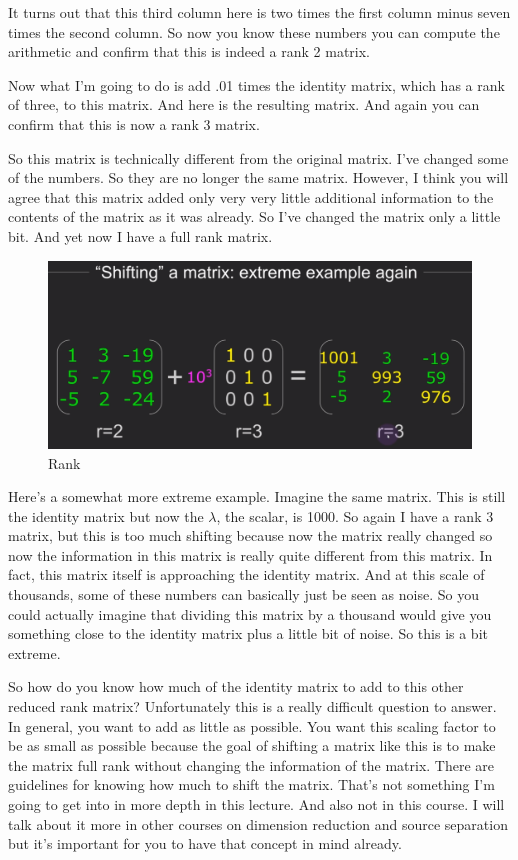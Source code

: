 \documentclass[fleqn,10pt]{olplainarticle}
\theoremstyle{definition}
\theoremstyle{remark}
\begin{document}
It turns out that this third column here is two times the first column minus seven times the second column. So now you know these numbers you can compute the arithmetic and confirm that this is indeed a rank 2 matrix.

Now what I'm going to do is add .01 times the identity matrix, which has a rank of three, to this matrix. And here is the resulting matrix. And again you can confirm that this is now a rank 3 matrix.

So this matrix is technically different from the original matrix. I've changed some of the numbers. So they are no longer the same matrix. However, I think you will agree that this matrix added only very very little additional information to the contents of the matrix as it was already. So I've changed the matrix only a little bit. And yet now I have a full rank matrix.

\begin{figure}[ht]
	\centering
	\includegraphics[width=0.5\linewidth]{images/rank-32.png}
	\caption{Rank}
	\label{fig:rank_32}
\end{figure}

Here's a somewhat more extreme example. Imagine the same matrix. This is still the identity matrix but now the $\lambda$, the scalar, is 1000. So again I have a rank 3 matrix, but this is too much shifting because now the matrix really changed so now the information in this matrix is really quite different from this matrix. In fact, this matrix itself is approaching the identity matrix. And at this scale of thousands, some of these numbers can basically just be seen as noise. So you could actually imagine that dividing this matrix by a thousand would give you something close to the identity matrix plus a little bit of noise. So this is a bit extreme.

So how do you know how much of the identity matrix to add to this other reduced rank matrix? Unfortunately this is a really difficult question to answer. In general, you want to add as little as possible. You want this scaling factor to be as small as possible because the goal of shifting a matrix like this is to make the matrix full rank without changing the information of the matrix. There are guidelines for knowing how much to shift the matrix. That's not something I'm going to get into in more depth in this lecture. And also not in this course. I will talk about it more in other courses on dimension reduction and source separation but it's important for you to have that concept in mind already.
\end{document}
